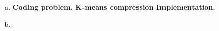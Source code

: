 \documentclass[12pt,letterpaper,boxed]{hmcpset}
\begin{document}
\begin{solution}
  \begin{enumerate}[(a)]
    \item \textbf{Coding problem. K-means compression Implementation.}
    
    \item 
  \end{enumerate}
\end{solution}
\end{document}
